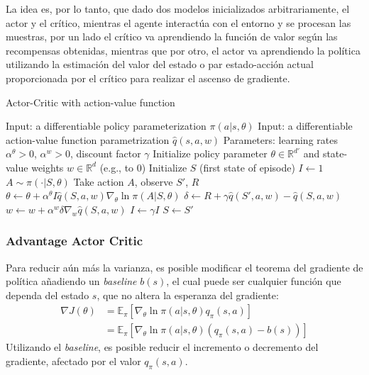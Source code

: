 La idea es, por lo tanto, que dado dos modelos inicializados arbitrariamente, el actor y el crítico, mientras el agente interactúa con el entorno y se procesan las muestras, por un lado el crítico va aprendiendo la función de valor según las recompensas obtenidas, mientras que por otro, el actor va aprendiendo la política utilizando la estimación del valor del estado o par estado-acción actual proporcionada por el crítico para realizar el ascenso de gradiente.

\begin{algorithm}[H]
\caption{Actor-Critic with action-value function}
\label{alg:actor_critic}
\begin{algorithmic}
\State Input: a differentiable policy parameterization $\pi(a|s,\theta)$
\State Input: a differentiable action-value function parametrization $\hat{q}(s,a,w)$
\State Parameters: learning rates $\alpha^\theta > 0$, $\alpha^w > 0$, discount factor $\gamma$ 
\State Initialize policy parameter $\theta \in \mathbb{R}^{d'}$ and state-value weights $w \in \mathbb{R}^{d}$ (e.g., to 0)
    \State Initialize $S$ (first state of episode)
    \State $I \gets 1$
        \State $A \sim \pi(\cdot|S, \theta)$
        \State Take action $A$, observe $S'$, $R$
        \State $\theta \gets \theta + \alpha^\theta I \hat{q}(S,a,w) \nabla_\theta \ln \pi(A|S, \theta)$
        \State $\delta \gets R + \gamma \hat{q}(S',a,w) - \hat{q}(S,a,w)$ 
        \State $w \gets w + \alpha^w \delta \nabla_w \hat{q}(S,a,w)$
        \State $I \gets \gamma I$
        \State $S \gets S'$
    \EndFor
\EndFor
\end{algorithmic}
\end{algorithm}

\subsubsection{Advantage Actor Critic}

Para reducir aún más la varianza, es posible modificar el teorema del gradiente de política añadiendo un \emph{baseline} $b(s)$, el cual puede ser cualquier función que dependa del estado $s$, que no altera la esperanza del gradiente:
\begin{equation}
    \begin{split}
        \nabla J(\theta) &= \mathbb{E}_\pi\left[\nabla_\theta \ln \pi(a|s,\theta) q_\pi(s,a) \right] \\
        &= \mathbb{E}_\pi\left[\nabla_\theta \ln \pi(a|s,\theta) (q_\pi(s,a) - b(s)) \right]
    \end{split}
    \label{baseline}
\end{equation}
Utilizando el \emph{baseline}, es posible reducir el incremento o decremento del gradiente, afectado por el valor $q_\pi(s,a)$.

